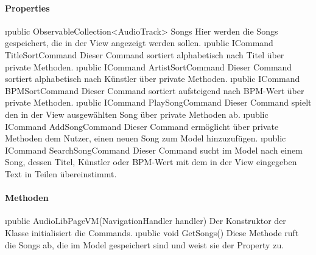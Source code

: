 \documentclass[../entwurf.tex]{subfiles}
\begin{document}
\paragraph{Properties}
\begin{itemize}
	\i{public ObservableCollection<AudioTrack> Songs} Hier werden die Songs gespeichert, die in der View angezeigt werden sollen.
	\i{public ICommand TitleSortCommand} Dieser Command sortiert  alphabetisch nach Titel über private Methoden. 
	\i{public ICommand ArtistSortCommand} Dieser Command sortiert  alphabetisch nach Künstler über private Methoden. 
	\i{public ICommand BPMSortCommand} Dieser Command sortiert  aufsteigend nach BPM-Wert über private Methoden. 
	\i{public ICommand PlaySongCommand} Dieser Command spielt den in der View ausgewählten Song über private Methoden ab. 
	\i{public ICommand AddSongCommand} Dieser Command ermöglicht über private Methoden dem Nutzer, einen neuen Song zum Model hinzuzufügen. 
	\i{public ICommand SearchSongCommand} Dieser Command sucht im Model nach einem Song, dessen Titel, Künstler oder BPM-Wert mit dem in der View eingegeben Text in Teilen übereinstimmt. 
\end{itemize}
\paragraph{Methoden}
\begin{itemize}
	\i{public AudioLibPageVM(NavigationHandler handler)} Der Konstruktor der Klasse initialisiert die Commands.
	\i{public void GetSongs()} Diese Methode ruft die Songs ab, die im Model gespeichert sind und weist sie der Property  zu.
\end{itemize}
\end{document}
